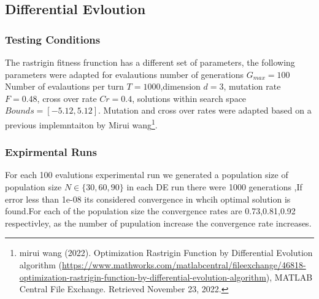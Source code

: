 \documentclass[
]{article}
\begin{document}
\hypertarget{differential-evloution}{%
\subsection{Differential Evloution}\label{differential-evloution}}

\hypertarget{testing-conditions}{%
\subsubsection{Testing Conditions}\label{testing-conditions}}

The rastrigin fitness frunction has a different set of parameters, the
following parameters were adapted for evalautions number of generations
\(G_{max}=100\) Number of evalautions per turn \(T=1000\),dimension
\(d=3\), mutation rate \(F=0.48\), cross over rate \(Cr=0.4\), solutions
within search space \(Bounds=[-5.12,5.12]\). Mutation and cross over
rates were adapted based on a previous implemntaiton by Mirui
wang\footnote{mirui wang (2022). Optimization Rastrigin Function by
  Differential Evolution algorithm
  (\url{https://www.mathworks.com/matlabcentral/fileexchange/46818-optimization-rastrigin-function-by-differential-evolution-algorithm}),
  MATLAB Central File Exchange. Retrieved November 23, 2022.}.

\hypertarget{expirmental-runs-1}{%
\subsubsection{Expirmental Runs}\label{expirmental-runs-1}}

\begin{table}[H]
\centering
{}
\end{table}

For each 100 evalutions experimental run we generated a population size
of population size \(N\in\{30,60,90\}\) in each DE run there were 1000
generations ,If error less than 1e-08 its considered convergence in
whcih optimal solution is found.For each of the population size the
convergence rates are 0.73,0.81,0.92 respectivley, as the number of
pupulation increase the convergence rate increases.
\end{document}
